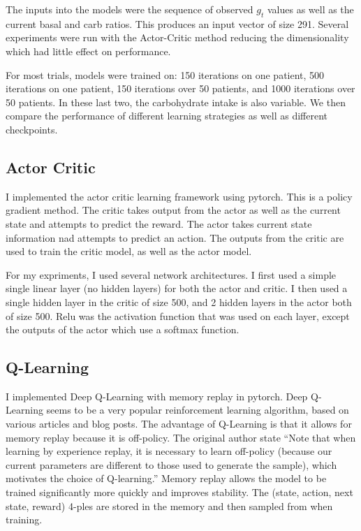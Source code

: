 \documentclass[11pt]{article}
\begin{document}
The inputs into the models were the sequence of observed $g_t$ values as well as the current basal and carb ratios.
This produces an input vector of size 291. 
Several experiments were run with the Actor-Critic method reducing the dimensionality which had little effect on performance.

For most trials, models were trained on: 150 iterations on one patient, 500 iterations on one patient, 150 iterations over 50 patients, and 1000 iterations over 50 patients.
In these last two, the carbohydrate intake is also variable. 
We then compare the performance of different learning strategies as well as different checkpoints.

\subsection{Actor Critic}
I implemented the actor critic learning framework using pytorch. 
This is a policy gradient method. 
The critic takes output from the actor as well as the current state and attempts to predict the reward.
The actor takes current state information nad attempts to predict an action.
The outputs from the critic are used to train the critic model, as well as the actor model. 

For my expriments, I used several network architectures.
I first used a simple single linear layer (no hidden layers) for both the actor and critic.
I then used a single hidden layer in the critic of size 500, and 2 hidden layers in the actor both of size 500.
Relu was the activation function that was used on each layer, except the outputs of the actor which use a softmax function.

\subsection{Q-Learning}
I implemented Deep Q-Learning with memory replay in pytorch. 
Deep Q-Learning seems to be a very popular reinforcement learning algorithm, based on various articles and blog posts.
The advantage of Q-Learning is that it allows for memory replay because it is off-policy.
The original author state 
``Note that when learning by experience replay, 
it is necessary to learn off-policy (because our current parameters are different to those used to 
generate the sample), which motivates the choice of Q-learning.'' \cite{mnih2013playing}
Memory replay allows the model to be trained significantly more quickly and improves stability. 
The (state, action, next state, reward) 4-ples are stored in the memory and then sampled from when training.
\end{document}
